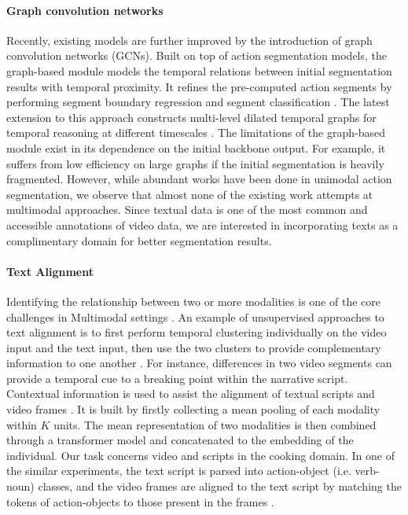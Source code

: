 \paragraph{Graph convolution networks} Recently, existing models are further improved by the introduction of graph convolution networks (GCNs). Built on top of action segmentation models, the graph-based module models the temporal relations between initial segmentation results with temporal proximity. It refines the pre-computed action segments by performing segment boundary regression and segment classification \cite{graphbased2020}. The latest extension to this approach constructs multi-level dilated temporal graphs for temporal reasoning at different timescales \cite{wang2020temporal}. The limitations of the graph-based module exist in its dependence on the initial backbone output. For example, it suffers from low efficiency on large graphs if the initial segmentation is heavily fragmented. However, while abundant works have been done in unimodal action segmentation, we observe that almost none of the existing work attempts at multimodal approaches. Since textual data is one of the most common and accessible annotations of video data, we are interested in incorporating texts as a complimentary domain for better segmentation results.

\paragraph{Text Alignment}
\iffalse
Covered paper:
- Multimodal Machine Learning: A Survey and Taxonomy
- Learning Semantic Concepts and Temporal Alignment for Narrated Video Procedural Captioning
- Unsupervised Learning from Narrated Instruction Videos
- What’s Cookin’? Interpreting Cooking Videos using Text, Speech and Vision
\fi
Identifying the relationship between two or more modalities is one of the core challenges in Multimodal settings \cite{MultiModalSurvey}. An example of unsupervised approaches to text alignment is to first perform temporal clustering individually on the video input and the text input, then use the two clusters to provide complementary information to one another \cite{unsupervised-align}. For instance, differences in two video segments can provide a temporal cue to a breaking point within the narrative script. Contextual information is used to assist the alignment of textual scripts and video frames \cite{temporalAlignShi}. It is built by firstly collecting a mean pooling of each modality within $K$ units. The mean representation of two modalities is then combined through a transformer model and concatenated to the embedding of the individual. Our task concerns video and scripts in the cooking domain. In one of the similar experiments, the text script is parsed into action-object (i.e. verb-noun) classes, and the video frames are aligned to the text script by matching the tokens of action-objects to those present in the frames \cite{malmaud-etal-2015-whats}.

